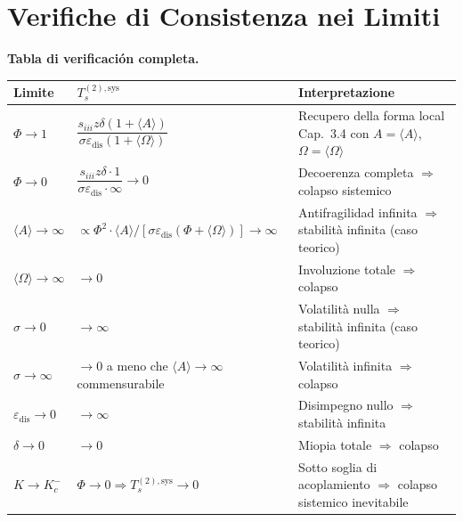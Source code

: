 \section{Verifiche di Consistenza nei
Limiti}\label{verifiche-di-consistenza-nei-limiti}

\Proved{} \textbf{Tabla di verificación completa.}

{\def\LTcaptype{none} %
{\small\begin{longtable}[]{@{}
  >{\raggedright\arraybackslash}p{}
  >{\raggedright\arraybackslash}p{}
  >{\raggedright\arraybackslash}p{}@{}}
\toprule\noalign{}
\begin{minipage}[b]{\linewidth}\raggedright
Limite
\end{minipage} & \begin{minipage}[b]{\linewidth}\raggedright
\(T_s^{(2),\text{sys}}\)
\end{minipage} & \begin{minipage}[b]{\linewidth}\raggedright
Interpretazione
\end{minipage} \\
\midrule\noalign{}
\endhead
\bottomrule\noalign{}
\endlastfoot
\(\Phi \to 1\) &
\(\dfrac{s_{iii}z\delta(1+\langle A\rangle)}{\sigma\varepsilon_{\text{dis}}(1+\langle\Omega\rangle)}\)
& Recupero della forma local Cap.~3.4 con \(A=\langle A\rangle\),
\(\Omega=\langle\Omega\rangle\) \Proved{} \\
\(\Phi \to 0\) &
\(\dfrac{s_{iii}z\delta \cdot 1}{\sigma\varepsilon_{\text{dis}} \cdot \infty} \to 0\)
& Decoerenza completa \(\Rightarrow\) colapso sistemico \Proved{} \\
\(\langle A\rangle \to \infty\) &
\(\propto \Phi^2 \cdot \langle A\rangle / [\sigma\varepsilon_{\text{dis}}(\Phi+\langle\Omega\rangle)] \to \infty\)
& Antifragilidad infinita \(\Rightarrow\) stabilità infinita (caso
teorico) \Proved{} \\
\(\langle\Omega\rangle \to \infty\) & \(\to 0\) & Involuzione totale
\(\Rightarrow\) colapso \Proved{} \\
\(\sigma \to 0\) & \(\to \infty\) & Volatilità nulla \(\Rightarrow\)
stabilità infinita (caso teorico) \Proved{} \\
\(\sigma \to \infty\) & \(\to 0\) a meno che
\(\langle A\rangle \to \infty\) commensurabile & Volatilità infinita
\(\Rightarrow\) colapso \Proved{} \\
\(\varepsilon_{\text{dis}} \to 0\) & \(\to \infty\) & Disimpegno nullo
\(\Rightarrow\) stabilità infinita \Proved{} \\
\(\delta \to 0\) & \(\to 0\) & Miopia totale \(\Rightarrow\) colapso
\Proved{} \\
\(K \to K_c^-\) & \(\Phi \to 0 \Rightarrow T_s^{(2),\text{sys}} \to 0\)
& Sotto soglia di acoplamiento \(\Rightarrow\) colapso sistemico
inevitabile \Proved{} \\
\end{longtable}}
}


